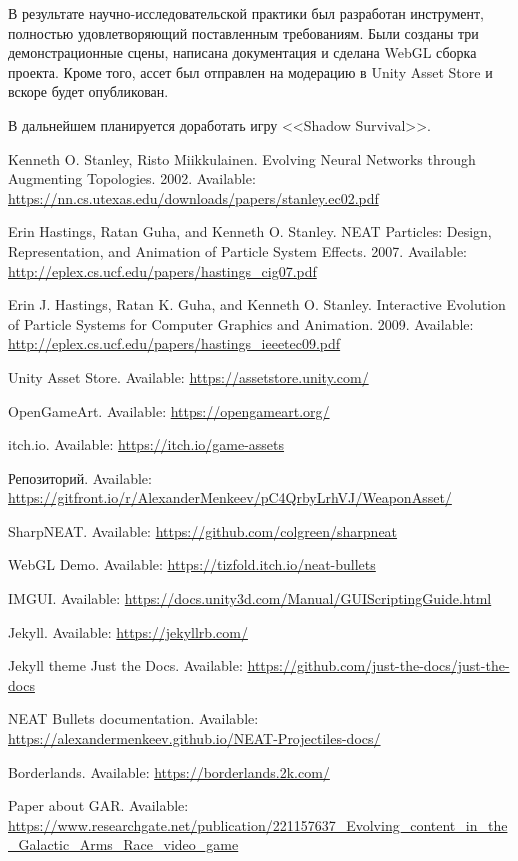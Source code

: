 ﻿

В результате научно-исследовательской практики был разработан инструмент, полностью удовлетворяющий поставленным требованиям. Были созданы три демонстрационные сцены, написана документация и сделана WebGL сборка проекта. Кроме того, ассет был отправлен на модерацию в Unity Asset Store и вскоре будет опубликован.

В дальнейшем планируется доработать игру <<Shadow Survival>>.

\pagebreak

\begin{thebibliography}{1}

     Kenneth O. Stanley, Risto Miikkulainen. \flqq Evolving Neural Networks through Augmenting Topologies\frqq. 2002. Available: \url{https://nn.cs.utexas.edu/downloads/papers/stanley.ec02.pdf}

     Erin Hastings, Ratan Guha, and Kenneth O. Stanley. \flqq NEAT Particles: Design, Representation, and Animation of Particle System Effects\frqq. 2007. Available: \url{http://eplex.cs.ucf.edu/papers/hastings_cig07.pdf}

     Erin J. Hastings, Ratan K. Guha, and Kenneth O. Stanley. \flqq Interactive Evolution of Particle Systems for Computer Graphics and Animation\frqq. 2009. Available: \url{http://eplex.cs.ucf.edu/papers/hastings_ieeetec09.pdf}

     Unity Asset Store. Available: \url{https://assetstore.unity.com/}

     OpenGameArt. Available: \url{https://opengameart.org/}

     itch.io. Available: \url{https://itch.io/game-assets}

     Репозиторий. Available: \url{https://gitfront.io/r/AlexanderMenkeev/pC4QrbyLrhVJ/WeaponAsset/}

     SharpNEAT. Available: \url{https://github.com/colgreen/sharpneat}

     WebGL Demo. Available: \url{https://tizfold.itch.io/neat-bullets}

     IMGUI. Available: \url{https://docs.unity3d.com/Manual/GUIScriptingGuide.html}

     Jekyll. Available: \url{https://jekyllrb.com/}

     Jekyll theme Just the Docs. Available: \url{https://github.com/just-the-docs/just-the-docs}

     NEAT Bullets documentation. Available: \url{https://alexandermenkeev.github.io/NEAT-Projectiles-docs/}

     Borderlands. Available: \url{https://borderlands.2k.com/}

     Paper about GAR. Available: \url{https://www.researchgate.net/publication/221157637_Evolving_content_in_the_Galactic_Arms_Race_video_game}

\end{thebibliography}